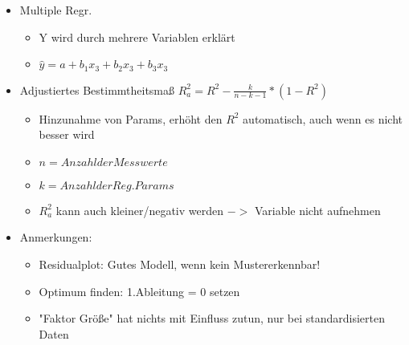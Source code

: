 \documentclass[a4paper]{article}
\begin{document}
\begin{landscape}
\begin{multicols}{4}
\begin{itemize}[noitemsep,nolistsep,leftmargin=*]
        \item Multiple Regr. 
        \begin{itemize}[noitemsep,nolistsep,leftmargin=*]
            \item Y wird durch mehrere Variablen erklärt
            \item $\hat{y} = a + b_1x_3 + b_2x_3 + b_3x_3$
        \end{itemize}
        \item Adjustiertes Bestimmtheitsmaß $R^2_{a} = R^2 - \frac{k}{n-k-1}*(1-R^2)$
        \begin{itemize}[noitemsep,nolistsep,leftmargin=*]
            \item Hinzunahme von Params, erhöht den $R^2$ automatisch, auch wenn es nicht besser wird
            \item $n = Anzahl der Messwerte$
            \item $k = Anzahl der Reg.Params$
            \item $R^2_{a}$ kann auch kleiner/negativ werden $->$ Variable nicht aufnehmen
        \end{itemize}
        \item Anmerkungen:
        \begin{itemize}[noitemsep,nolistsep,leftmargin=*]
            \item Residualplot: Gutes Modell, wenn kein Mustererkennbar!
            \item Optimum finden: 1.Ableitung = 0 setzen
            \item "Faktor Größe" hat nichts mit Einfluss zutun, nur bei standardisierten Daten
        \end{itemize}
    \end{itemize}


\end{multicols}
\end{landscape}
\end{document}
